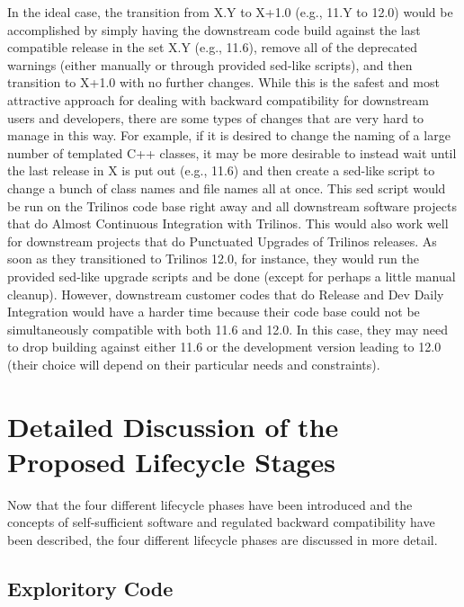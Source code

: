 \documentclass[11pt]{SANDreport}
\begin{document}
In the ideal case, the transition from X.Y to X+1.0 (e.g., 11.Y to
12.0) would be accomplished by simply having the downstream code build
against the last compatible release in the set X.Y (e.g., 11.6),
remove all of the deprecated warnings (either manually or through
provided sed-like scripts), and then transition to X+1.0 with no
further changes.  While this is the safest and most attractive approach
for dealing with backward compatibility for downstream users and
developers, there are some types of changes that are very hard to
manage in this way.  For example, if it is desired to change the
naming of a large number of templated C++ classes, it may be more
desirable to instead wait until the last release in X is put out
(e.g., 11.6) and then create a sed-like script to change a bunch of
class names and file names all at once.  This sed script would be run
on the Trilinos code base right away and all downstream software
projects that do Almost Continuous Integration
{}\cite{SoftwareIntegrationforCSE09} with Trilinos.  This would also
work well for downstream projects that do Punctuated Upgrades
{}\cite{SoftwareIntegrationforCSE09} of Trilinos releases.  As soon as
they transitioned to Trilinos 12.0, for instance, they would run the
provided sed-like upgrade scripts and be done (except for perhaps a
little manual cleanup).  However, downstream customer codes that do
Release and Dev Daily Integration {}\cite{SoftwareIntegrationforCSE09}
would have a harder time because their code base could not be
simultaneously compatible with both 11.6 and 12.0.  In this case, they
may need to drop building against either 11.6 or the development
version leading to 12.0 (their choice will depend on their particular
needs and constraints).


%
{}\section{Detailed Discussion of the Proposed Lifecycle Stages}
\label{sec:detained_lifecycle_stages}
%

Now that the four different lifecycle phases have been introduced and
the concepts of self-sufficient software and regulated backward
compatibility have been described, the four different lifecycle phases
are discussed in more detail.


%
{}\subsection{Exploritory Code}
\label{sec:exploratory_code}
%
\end{document}
